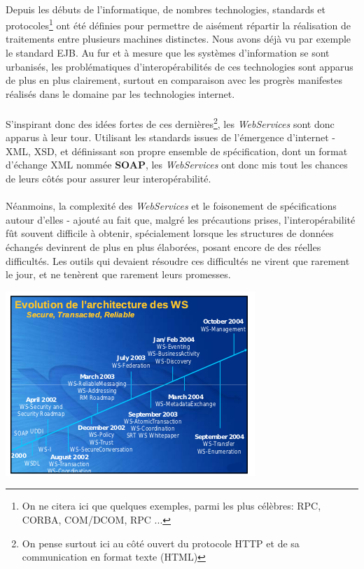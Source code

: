 {  

  \paragraph{} Depuis les débuts de l'informatique, de nombres technologies, standards et
  protocoles\footnote{On ne citera ici que quelques exemples, parmi les plus célèbres: RPC, CORBA,
  COM/DCOM, RPC ...} ont été définies pour permettre de aisément répartir la réalisation de traitements
  entre plusieurs machines distinctes. Nous avons déjà vu par exemple le standard EJB. Au fur et à
  mesure que les systèmes d'information se sont urbanisés, les problématiques d'interopérabilités de
  ces technologies sont apparus de plus en plus clairement, surtout en comparaison avec les progrès
  manifestes réalisés dans le domaine par les technologies internet.

  \paragraph{} S'inspirant donc des idées fortes de ces dernières\footnote{On pense surtout ici au
  côté ouvert du protocole HTTP et de sa communication en format texte (HTML)}, les
  \textit{WebServices} sont donc apparus à leur tour. Utilisant les standards issues de l'émergence
  d'internet - XML, XSD, et définissant son propre ensemble de spécification, dont un format
  d'échange XML nommée \textbf{SOAP}, les \textit{WebServices} ont donc mis tout les chances de
  leurs côtés pour assurer leur interopérabilité.

  \paragraph{} Néanmoins, la complexité des \textit{WebServices} et le foisonement de spécifications
  autour d'elles - ajouté au fait que, malgré les précautions prises, l'interopérabilité fût souvent
  difficile à obtenir, spécialement lorsque les structures de données échangés devinrent de plus en
  plus élaborées, posant encore de des réelles difficultés. Les outils qui devaient résoudre ces
  difficultés ne virent que rarement le jour, et ne tenèrent que rarement leurs promesses.

  \begin{center}
    \includegraphics[scale=0.8]{img/ws-star.png}
  \end{center}

}
